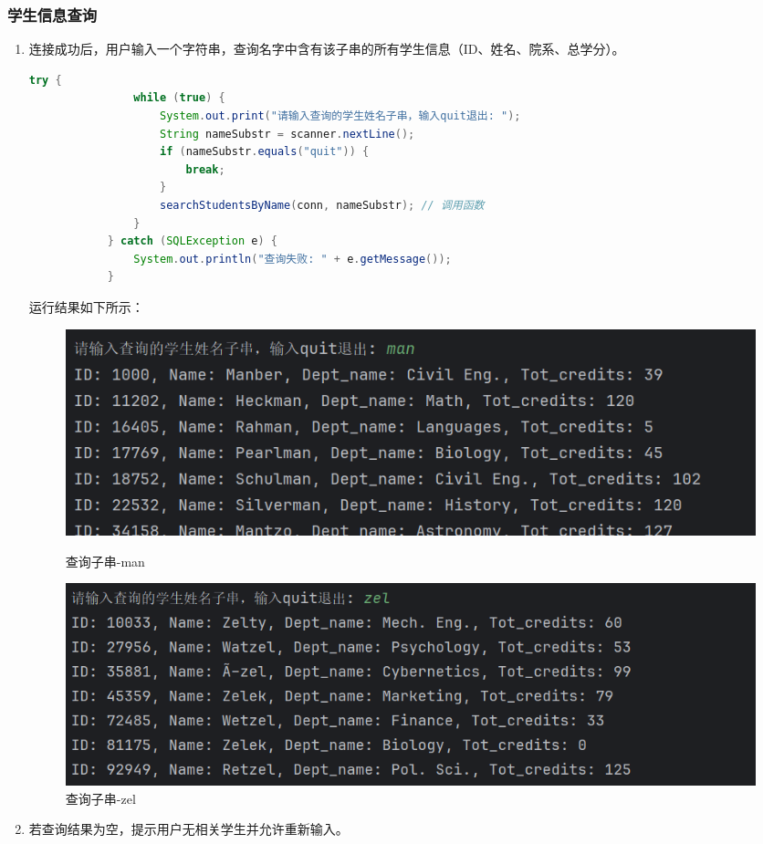 \documentclass{article}
\begin{document}
	\subsubsection{学生信息查询}
	\begin{enumerate}
		\item 连接成功后，用户输入一个字符串，查询名字中含有该子串的所有学生信息（ID、姓名、院系、总学分）。
		
		\begin{lstlisting}[language=java, title=输入学生姓名, tabsize=4]
			try {
				while (true) {
					System.out.print("请输入查询的学生姓名子串，输入quit退出: ");
					String nameSubstr = scanner.nextLine();
					if (nameSubstr.equals("quit")) {
						break;
					}
					searchStudentsByName(conn, nameSubstr); // 调用函数
				}
			} catch (SQLException e) {
				System.out.println("查询失败: " + e.getMessage());
			}
		\end{lstlisting}
		
		运行结果如下所示：
		
		\begin{figure}[H]
			\centering
			\begin{minipage}[b]{0.45\textwidth}
				\includegraphics[width=\textwidth]{./images/18.查询子串1.png}
				\caption{查询子串-man}
			\end{minipage}
			\hfill
			\begin{minipage}[b]{0.45\textwidth}
				\includegraphics[width=\textwidth]{./images/18.查询子串2.png}
				\caption{查询子串-zel}
			\end{minipage}
		\end{figure}
		
		\item 若查询结果为空，提示用户无相关学生并允许重新输入。
		

\end{enumerate}
\end{document}
